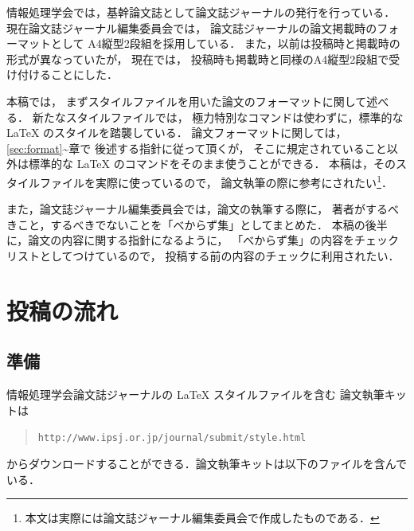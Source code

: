 \documentclass[submit]{ipsj}
\begin{document}
情報処理学会では，基幹論文誌として論文誌ジャーナルの発行を行っている． 現在論文誌ジャーナル編集委員会では， 論文誌ジャーナルの論文掲載時のフォーマットとして A4縦型2段組を採用している． また，以前は投稿時と掲載時の形式が異なっていたが， 現在では， 投稿時も掲載時と同様のA4縦型2段組で受け付けることにした．

本稿では， まずスタイルファイルを用いた論文のフォーマットに関して述べる． 新たなスタイルファイルでは， 極力特別なコマンドは使わずに，標準的な LaTeX のスタイルを踏襲している． 論文フォーマットに関しては，\ref{sec:format}\textasciitilde 章で 後述する指針に従って頂くが， そこに規定されていること以外は標準的な LaTeX のコマンドをそのまま使うことができる． 本稿は，そのスタイルファイルを実際に使っているので， 論文執筆の際に参考にされたい\footnote{本文は実際には論文誌ジャーナル編集委員会で作成したものである．}．

また，論文誌ジャーナル編集委員会では，論文の執筆する際に， 著者がするべきこと，するべきでないことを「べからず集」としてまとめた． 本稿の後半に，論文の内容に関する指針になるように， 「べからず集」の内容をチェックリストとしてつけているので， 投稿する前の内容のチェックに利用されたい．

\section{投稿の流れ}\label{ux6295ux7a3fux306eux6d41ux308c}

\subsection{準備}\label{ux6e96ux5099}

情報処理学会論文誌ジャーナルの LaTeX スタイルファイルを含む 論文執筆キットは

\begin{quote}
\texttt{http://www.ipsj.or.jp/journal/submit/style.html}
\end{quote}

からダウンロードすることができる．論文執筆キットは以下のファイルを含んでいる．
\end{document}
